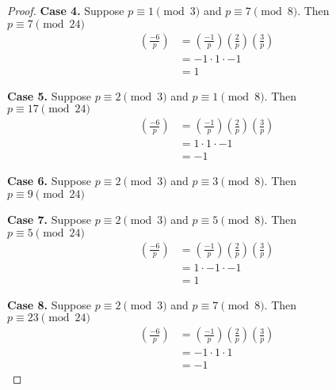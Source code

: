 \begin{proof}
\textbf{Case 4.}
Suppose $p \equiv 1 \pmod{3}$ and $p \equiv 7 \pmod{8}$. Then \\
$p \equiv 7 \pmod{24}$
\begin{align*}
\left( \frac{-6}{p} \right) 
&= \left( \frac{-1}{p} \right) \left( \frac{2}{p} \right) \left( \frac{3}{p} \right) \\
&= -1 \cdot 1 \cdot -1 \\
&= 1
\end{align*}

\textbf{Case 5.}
Suppose $p \equiv 2 \pmod{3}$ and $p \equiv 1 \pmod{8}$. Then \\
$p \equiv 17 \pmod{24}$
\begin{align*}
\left( \frac{-6}{p} \right) 
&= \left( \frac{-1}{p} \right) \left( \frac{2}{p} \right) \left( \frac{3}{p} \right) \\
&= 1 \cdot 1 \cdot -1 \\
&= -1
\end{align*}

\textbf{Case 6.}
Suppose $p \equiv 2 \pmod{3}$ and $p \equiv 3 \pmod{8}$. Then \\
$p \equiv 9 \pmod{24}$

\textbf{Case 7.}
Suppose $p \equiv 2 \pmod{3}$ and $p \equiv 5 \pmod{8}$. Then \\
$p \equiv 5 \pmod{24}$
\begin{align*}
\left( \frac{-6}{p} \right) 
&= \left( \frac{-1}{p} \right) \left( \frac{2}{p} \right) \left( \frac{3}{p} \right) \\
&= 1 \cdot -1 \cdot -1 \\
&= 1
\end{align*}

\textbf{Case 8.}
Suppose $p \equiv 2 \pmod{3}$ and $p \equiv 7 \pmod{8}$. Then \\
$p \equiv 23 \pmod{24}$
\begin{align*}
\left( \frac{-6}{p} \right) 
&= \left( \frac{-1}{p} \right) \left( \frac{2}{p} \right) \left( \frac{3}{p} \right) \\
&= -1 \cdot 1 \cdot 1 \\
&= -1
\end{align*}
\end{proof}
